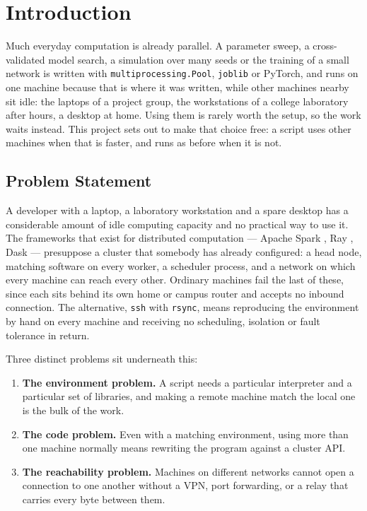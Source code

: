 \chapter{Introduction}
\label{chap:intro}

Much everyday computation is already parallel. A parameter sweep, a
cross-validated model search, a simulation over many seeds or the training of a
small network is written with \texttt{multiprocessing.Pool}, \texttt{joblib}
or PyTorch, and runs on one machine because that is where it was written, while
other machines nearby sit idle: the laptops of a project group, the
workstations of a college laboratory after hours, a desktop at home. Using them
is rarely worth the setup, so the work waits instead. This project sets out to
make that choice free: a script uses other machines when that is faster, and
runs as before when it is not.

\section{Problem Statement}

A developer with a laptop, a laboratory workstation and a spare desktop has a
considerable amount of idle computing capacity and no practical way to use it.
The frameworks that exist for distributed computation --- Apache Spark
\cite{zaharia2010spark}, Ray \cite{moritz2018ray}, Dask \cite{rocklin2015dask}
--- presuppose a cluster that somebody has already configured: a head node,
matching software on every worker, a scheduler process, and a network on which
every machine can reach every other. Ordinary machines fail the last of these,
since each sits behind its own home or campus router and accepts no inbound
connection. The alternative, \texttt{ssh} with \texttt{rsync}, means reproducing
the environment by hand on every machine and receiving no scheduling, isolation
or fault tolerance in return.

Three distinct problems sit underneath this:

\begin{enumerate}[leftmargin=*, label=\arabic*.]
  \item \textbf{The environment problem.} A script needs a particular
  interpreter and a particular set of libraries, and making a remote machine
  match the local one is the bulk of the work.
  \item \textbf{The code problem.} Even with a matching environment, using more
  than one machine normally means rewriting the program against a cluster API.
  \item \textbf{The reachability problem.} Machines on different networks cannot
  open a connection to one another without a VPN, port forwarding, or a relay
  that carries every byte between them.
\end{enumerate}

